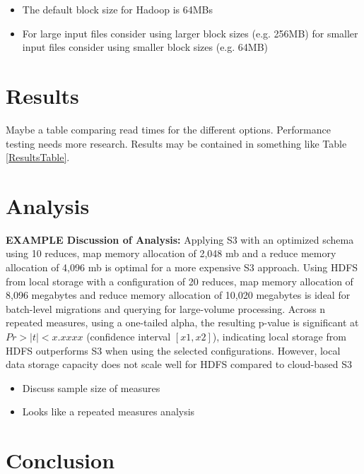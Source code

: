 \documentclass[journal]{IEEEtran}
\begin{document}
\begin{itemize}
	\item The default block size for Hadoop is 64MBs \cite{OptimizeHadoop}
	\item For large input files consider using larger block sizes (e.g. 256MB) for smaller input files consider using smaller block sizes (e.g. 64MB) \cite{OptimizeHadoop}
\end{itemize}


\section{Results}

Maybe a table comparing read times for the different options.
Performance testing needs more research.
Results may be contained in something like Table \ref{ResultsTable}.

\section{Analysis}

\textbf{EXAMPLE Discussion of Analysis:} Applying S3 with an optimized schema using 10 reduces, map memory allocation of 2,048 mb and a reduce memory allocation of 4,096 mb is optimal for a more expensive S3 approach. Using HDFS from local storage with a configuration of 20 reduces, map memory allocation of 8,096 megabytes and reduce memory allocation of 10,020 megabytes is ideal for batch-level migrations and querying for large-volume processing. Across n repeated measures, using a one-tailed alpha, the resulting p-value is significant at $Pr > |t| < x.xxxx$ (confidence interval $[x1, x2]$), indicating local storage from HDFS outperforms S3 when using the selected configurations. However, local data storage capacity does not scale well for HDFS compared to cloud-based S3



\begin{itemize}
    \item Discuss sample size of measures
    \item Looks like a repeated measures analysis
\end{itemize}


\section{Conclusion}
\end{document}
